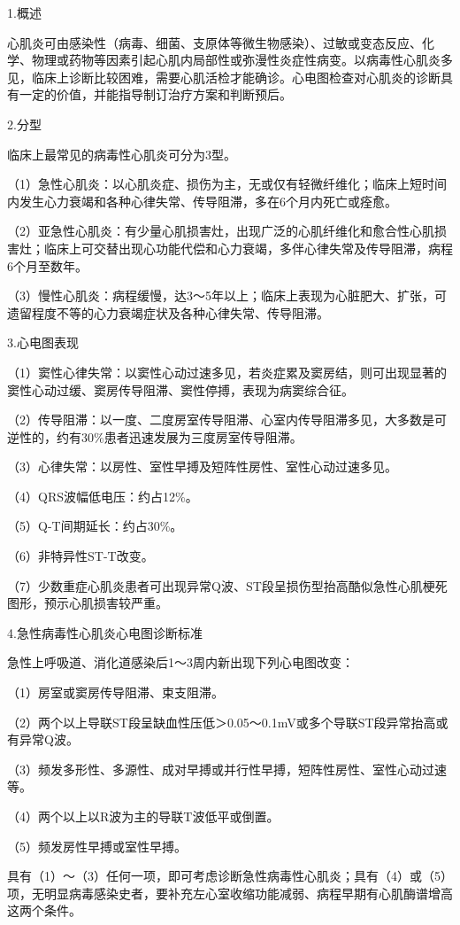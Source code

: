 1.概述

心肌炎可由感染性（病毒、细菌、支原体等微生物感染）、过敏或变态反应、化学、物理或药物等因素引起心肌内局部性或弥漫性炎症性病变。以病毒性心肌炎多见，临床上诊断比较困难，需要心肌活检才能确诊。心电图检查对心肌炎的诊断具有一定的价值，并能指导制订治疗方案和判断预后。

2.分型

临床上最常见的病毒性心肌炎可分为3型。

（1）急性心肌炎：以心肌炎症、损伤为主，无或仅有轻微纤维化；临床上短时间内发生心力衰竭和各种心律失常、传导阻滞，多在6个月内死亡或痊愈。

（2）亚急性心肌炎：有少量心肌损害灶，出现广泛的心肌纤维化和愈合性心肌损害灶；临床上可交替出现心功能代偿和心力衰竭，多伴心律失常及传导阻滞，病程6个月至数年。

（3）慢性心肌炎：病程缓慢，达3～5年以上；临床上表现为心脏肥大、扩张，可遗留程度不等的心力衰竭症状及各种心律失常、传导阻滞。

3.心电图表现

（1）窦性心律失常：以窦性心动过速多见，若炎症累及窦房结，则可出现显著的窦性心动过缓、窦房传导阻滞、窦性停搏，表现为病窦综合征。

（2）传导阻滞：以一度、二度房室传导阻滞、心室内传导阻滞多见，大多数是可逆性的，约有30\%患者迅速发展为三度房室传导阻滞。

（3）心律失常：以房性、室性早搏及短阵性房性、室性心动过速多见。

（4）QRS波幅低电压：约占12\%。

（5）Q-T间期延长：约占30\%。

（6）非特异性ST-T改变。

（7）少数重症心肌炎患者可出现异常Q波、ST段呈损伤型抬高酷似急性心肌梗死图形，预示心肌损害较严重。

4.急性病毒性心肌炎心电图诊断标准

急性上呼吸道、消化道感染后1～3周内新出现下列心电图改变：

（1）房室或窦房传导阻滞、束支阻滞。

（2）两个以上导联ST段呈缺血性压低＞0.05～0.1mV或多个导联ST段异常抬高或有异常Q波。

（3）频发多形性、多源性、成对早搏或并行性早搏，短阵性房性、室性心动过速等。

（4）两个以上以R波为主的导联T波低平或倒置。

（5）频发房性早搏或室性早搏。

具有（1）～（3）任何一项，即可考虑诊断急性病毒性心肌炎；具有（4）或（5）项，无明显病毒感染史者，要补充左心室收缩功能减弱、病程早期有心肌酶谱增高这两个条件。

